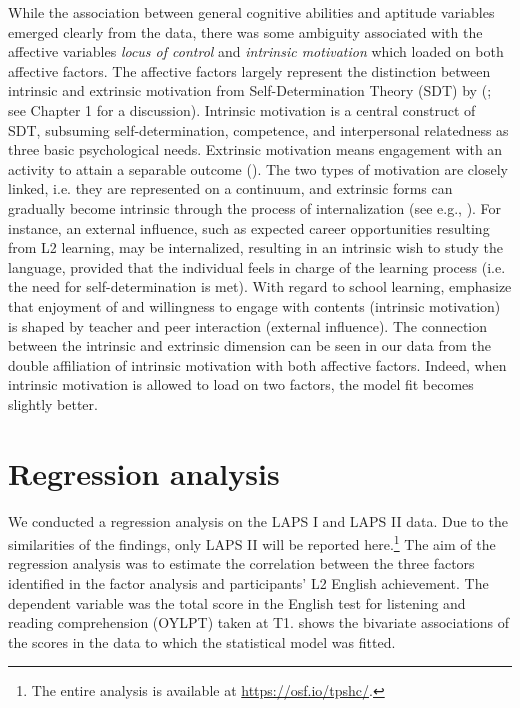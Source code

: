 \documentclass[output=paper]{langsci/langscibook}
\begin{document}
While the association between general cognitive abilities and aptitude variables emerged clearly from the data, there was some ambiguity associated with the affective variables \textit{locus of control} and \textit{intrinsic motivation} which loaded on both affective factors. The affective factors largely represent the distinction between intrinsic and extrinsic motivation from Self-Determination Theory (SDT) by \citeauthor{DeciRyan1985} (\citeyear{DeciRyan1985, DeciRyan2002}; see Chapter 1 for a discussion). Intrinsic motivation is a central construct of SDT, subsuming self-determination, competence, and interpersonal relatedness as three basic psychological needs. Extrinsic motivation means engagement with an activity to attain a separable outcome (\citealt[60]{DeciRyan2000}). The two types of motivation are closely linked, i.e. they are represented on a continuum, and extrinsic forms can gradually become intrinsic through the process of internalization (see e.g., \citealt{DeciRyan1985}). For instance, an external influence, such as expected career opportunities resulting from L2 learning, may be internalized, resulting in an intrinsic wish to study the language, provided that the individual feels in charge of the learning process (i.e. the need for self-determination is met). With regard to school learning,  \citet[64]{DeciRyan2000} emphasize that enjoyment of and willingness to engage with contents (intrinsic motivation) is shaped by teacher and peer interaction (external influence). The connection between the intrinsic and extrinsic dimension can be seen in our data from the double affiliation of intrinsic motivation with both affective factors. Indeed, when intrinsic motivation is allowed to load on two factors, the model fit becomes slightly better.

\section{Regression analysis}

We conducted a regression analysis on the LAPS I and LAPS II data. Due to the similarities of the findings, only LAPS II will be reported here.\footnote{The entire analysis is available at \url{https://osf.io/tpshc/}.} The aim of the regression analysis was to estimate the correlation between the three factors identified in the factor analysis and participants’ L2 English achievement. The dependent variable was the total score in the English test for listening and reading comprehension (OYLPT) taken at T1.  shows the bivariate associations of the scores in the data to which the statistical model was fitted.
\end{document}

